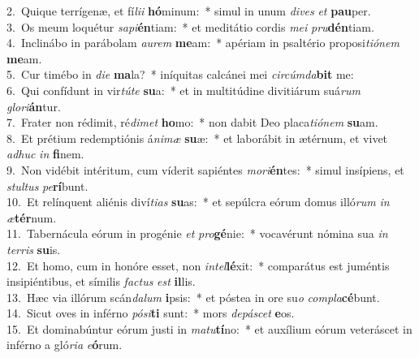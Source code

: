 {2.~}Quique terrígenæ, et fí\textit{li}\textit{i} \textbf{hó}minum:~* simul in unum \textit{di}\textit{ves} \textit{et} \textbf{pau}per.\\
{3.~}Os meum loquétur \textit{sa}\textit{pi}\textbf{én}tiam:~* et meditátio cordis \textit{me}\textit{i} \textit{pru}\textbf{dén}tiam.\\
{4.~}Inclinábo in parábolam \textit{au}\textit{rem} \textbf{me}am:~* apériam in psaltério proposi\textit{ti}\textit{ó}\textit{nem} \textbf{me}am.\\
{5.~}Cur timébo in \textit{di}\textit{e} \textbf{ma}la?~* iníquitas calcánei mei \textit{cir}\textit{cúm}\textit{da}\textbf{bit} me:\\
{6.~}Qui confídunt in vir\textit{tú}\textit{te} \textbf{su}a:~* et in multitúdine divitiárum suá\textit{rum} \textit{glo}\textit{ri}\textbf{án}tur.\\
{7.~}Frater non rédimit, ré\textit{di}\textit{met} \textbf{ho}mo:~* non dabit Deo placa\textit{ti}\textit{ó}\textit{nem} \textbf{su}am.\\
{8.~}Et prétium redemptiónis á\textit{ni}\textit{mæ} \textbf{su}æ:~* et laborábit in ætérnum, et vivet \textit{a}\textit{dhuc} \textit{in} \textbf{fi}nem.\\
{9.~}Non vidébit intéritum, cum víderit sapiéntes \textit{mo}\textit{ri}\textbf{én}tes:~* simul insípiens, et \textit{stul}\textit{tus} \textit{pe}\textbf{rí}bunt.\\
{10.~}Et relínquent aliénis diví\textit{ti}\textit{as} \textbf{su}as:~* et sepúlcra eórum domus illó\textit{rum} \textit{in} \textit{æ}\textbf{tér}num.\\
{11.~}Tabernácula eórum in progénie \textit{et} \textit{pro}\textbf{gé}nie:~* vocavérunt nómina sua \textit{in} \textit{ter}\textit{ris} \textbf{su}is.\\
{12.~}Et homo, cum in honóre esset, non \textit{in}\textit{tel}\textbf{lé}xit:~* comparátus est juméntis insipiéntibus, et símilis \textit{fa}\textit{ctus} \textit{est} \textbf{il}lis.\\
{13.~}Hæc via illórum scán\textit{da}\textit{lum} \textbf{i}psis:~* et póstea in ore su\textit{o} \textit{com}\textit{pla}\textbf{cé}bunt.\\
{14.~}Sicut oves in inférno \textit{pó}\textit{si}\textbf{ti} sunt:~* mors \textit{de}\textit{pá}\textit{scet} \textbf{e}os.\\
{15.~}Et dominabúntur eórum justi in \textit{ma}\textit{tu}\textbf{tí}no:~* et auxílium eórum veteráscet in inférno a gló\textit{ri}\textit{a} \textit{e}\textbf{ó}rum.\\
